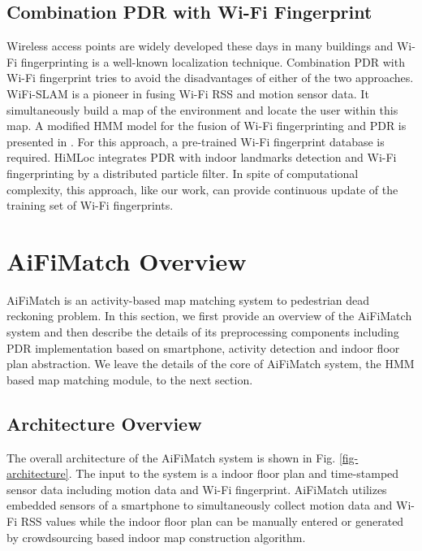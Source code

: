 \documentclass{llncs}
\begin{document}
\subsection{Combination PDR with Wi-Fi Fingerprint}

Wireless access points are widely developed these days in many buildings and Wi-Fi fingerprinting is a well-known localization technique. Combination PDR with Wi-Fi fingerprint tries to avoid the disadvantages of either of the two approaches. WiFi-SLAM \cite{Ferris2007WiFi} is a pioneer in fusing Wi-Fi RSS and motion sensor data. It simultaneously build a map of the environment and locate the user within this map. A modified HMM model for the fusion of Wi-Fi fingerprinting and PDR is presented in \cite{hoang2013hidden}. For this approach, a pre-trained Wi-Fi fingerprint database is required. HiMLoc \cite{radu2013himloc} integrates PDR with indoor landmarks detection and Wi-Fi fingerprinting by a distributed particle filter. In spite of computational complexity, this approach, like our work, can provide continuous update of the training set of Wi-Fi fingerprints.

\section{AiFiMatch Overview}

AiFiMatch is an activity-based map matching system to pedestrian dead reckoning problem. In this section, we first provide an overview of the AiFiMatch system and then describe the details of its preprocessing components including PDR implementation based on smartphone, activity detection and indoor floor plan abstraction. We leave the details of the core of AiFiMatch system, the HMM based map matching module, to the next section.

\subsection{Architecture Overview}

The overall architecture of the AiFiMatch system is shown in Fig. \ref{fig-architecture}. The input to the system is a indoor floor plan and time-stamped sensor data including motion data and Wi-Fi fingerprint. AiFiMatch utilizes embedded sensors of a smartphone to simultaneously collect motion data and Wi-Fi RSS values while the indoor floor plan can be manually entered or generated by crowdsourcing based indoor map construction algorithm.
\end{document}
